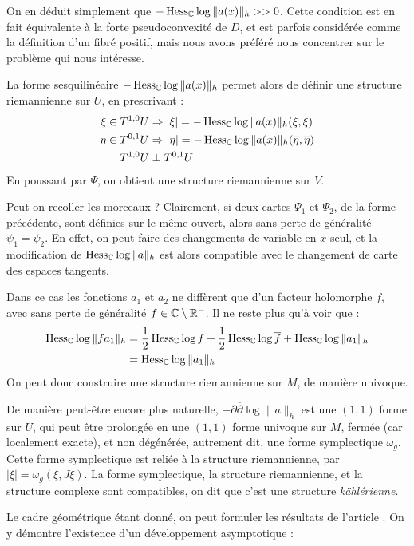 On en déduit simplement que $-\operatorname{Hess}_{\mathbb{C}} \log \|a(x)\|_h >> 0$. Cette condition est en fait équivalente à la forte pseudoconvexité de $D$, et est parfois considérée comme la définition d'un fibré positif, mais nous avons préféré nous concentrer sur le problème qui nous intéresse.

La forme sesquilinéaire $-\operatorname{Hess}_{\mathbb{C}}\log \|a(x)\|_h$ permet alors de définir une structure riemannienne sur $U$, en prescrivant :
\begin{align*}
	\xi \in T^{1,0}U&\Rightarrow |\xi|=-\operatorname{Hess}_{\mathbb{C}}\log \|a(x)\|_h(\xi,\xi)\\
	\eta \in T^{0,1}U&\Rightarrow |\eta|=-\operatorname{Hess}_{\mathbb{C}}\log \|a(x)\|_h(\overline{\eta},\overline{\eta})\\
	T^{1,0}  U & \perp T^{0,1}U
\end{align*}
En poussant par $\Psi$, on obtient une structure riemannienne sur $V$.

Peut-on recoller les morceaux ? Clairement, si deux cartes $\Psi_1$ et $\Psi_2$, de la forme précédente, sont définies sur le même ouvert, alors sans perte de généralité $\psi_1=\psi_2$. En effet, on peut faire des changements de variable en $x$ seul, et la modification de $\operatorname{Hess}_{\mathbb{C}}\log \|a\|_h$  est alors compatible avec le changement de carte des espaces tangents.

Dans ce cas les fonctions $a_1$ et $a_2$ ne diffèrent que d'un facteur holomorphe $f$, avec sans perte de généralité $f \in \mathbb{C} \setminus \mathbb{R}^-$. Il ne reste plus qu'à voir que :
\begin{align*}
	\operatorname{Hess}_{\mathbb{C}}\log \|fa_1\|_h &= \frac 12 \operatorname{Hess}_{\mathbb{C}} \log f + \frac 12 \operatorname{Hess}_{\mathbb{C}} \log \overline{f} + \operatorname{Hess}_{\mathbb{C}} \log \|a_1\|_h\\
		&= \operatorname{Hess}_{\mathbb{C}} \log \|a_1\|_h
\end{align*}
On peut donc construire une structure riemannienne sur $M$, de manière univoque. 

De manière peut-être encore plus naturelle, $-\partial \overline{\partial}\log \|a\|_h$ est une $(1,1)$ forme sur $U$, qui peut être prolongée en une $(1,1)$ forme univoque sur $M$, fermée (car localement exacte), et non dégénérée, autrement dit, une forme symplectique $\omega_g$. Cette forme symplectique est reliée à la structure riemannienne, par $|\xi|=\omega_g(\xi,J\xi)$. La forme symplectique, la structure riemannienne, et la structure complexe sont compatibles, on dit que c'est une structure \emph{kählérienne}.

Le cadre géométrique étant donné, on peut formuler les résultats de l'article \cite{Zelditch2000}. On y démontre l'existence d'un développement asymptotique :

